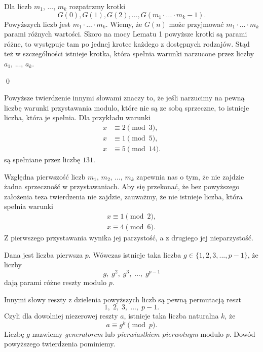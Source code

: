 
\noindent
Dla liczb $m_1$, ..., $m_k$ rozpatrzmy krotki
\[
	G(0), G(1), G(2), ..., G(m_1 \cdot ...\cdot m_k - 1).
\]
Powyższych liczb jest $m_1 \cdot ...\cdot m_k$. Wiemy, że $G(n)$ może przyjmować $m_1 \cdot ...\cdot m_k$ parami różnych wartości. Skoro na mocy Lematu 1 powyższe krotki są parami różne, to występuje tam po jednej krotce każdego z dostępnych rodzajów. Stąd też w szczególności istnieje krotka, która spełnia warunki narzucone przez liczby $a_1$, ..., $a_k$.

\qed
\vspace{5px}

\noindent
Powyższe twierdzenie innymi słowami znaczy to, że jeśli narzucimy na pewną liczbę warunki przystawania modulo, które nie są ze sobą sprzeczne, to istnieje liczba, która je spełnia. Dla przykładu warunki
\begin{align*}
	x &\equiv 2 \pmod{3}, \\
	x &\equiv 1 \pmod{5}, \\
	x &\equiv 5 \pmod{14}.
\end{align*}
są spełniane przez liczbę $131$.

\vspace{10px}

\noindent
Względna pierwszość liczb $m_1$, $m_2$, ..., $m_k$ zapewnia nas o tym, że nie zajdzie żadna sprzeczność w przystawaniach. Aby się przekonać, że bez powyższego założenia teza twierdzenia nie zajdzie, zauważmy, że nie istnieje liczba, która spełnia warunki
\begin{gather*}
	x \equiv 1 \pmod{2}, \\
	x \equiv 4 \pmod{6}.
\end{gather*}
Z pierwszego przystawania wynika jej parzystość, a z drugiego jej nieparzystość.

\vspace{10px}


\noindent
Dana jest liczba pierwsza $p$. Wówczas istnieje taka liczba $g \in \{1, 2, 3, ..., p - 1\}$, że liczby 
\[
	g,\; g^2,\; g^3,\; ...,\; g^{p - 1}
\]
dają parami różne reszty modulo $p$.

\vspace{20px}

\noindent
Innymi słowy reszty z dzielenia powyższych liczb są pewną permutacją reszt
\[
	1,\; 2,\; 3,\; ...,\;  p - 1.
\]
Czyli dla dowolniej niezerowej reszty $a$, istnieje taka liczba naturalna $k$, że 
\[
	a \equiv g^k \pmod{p}.
\]
Liczbę $g$ nazwiemy \textit{generatorem} lub \textit{pierwiastkiem pierwotnym} modulo $p$. Dowód powyższego twierdzenia pominiemy.


